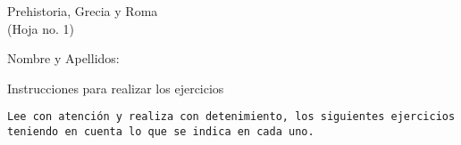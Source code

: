 \documentclass[letterpaper,12pt,notitlepage,spanish]{article}
\begin{document}
%
%
%
\begin{center}
\Large{
Prehistoria, Grecia y Roma
} \\
\vspace*{0.5cm}
%
%
\normalsize %
(Hoja no. 1)
\\
\vspace{1.10cm}
	\begin{flushleft}
	Nombre y Apellidos: \hrulefill\\
	\vspace*{0.50cm}
		\begin{center}
		\small{Instrucciones para realizar los ejercicios}\\		
		\end{center}
	\vspace*{0.25cm}
%
\small{ %
\texttt{Lee con atención y realiza con detenimiento, los siguientes ejercicios teniendo en cuenta lo que se indica en cada uno. \\
}} %
%
	\vspace*{0.25cm}		
 	\end{flushleft}
\end{center}
%
%
%
%
%
%
%
%
\end{document}
